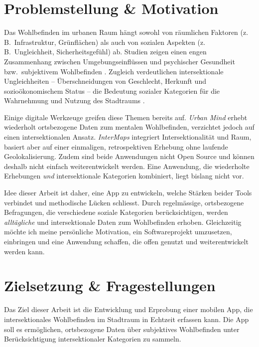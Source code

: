 \documentclass{template}
\begin{document}
\maketitle




\section{Problemstellung \& Motivation}
Das Wohlbefinden im urbanen Raum hängt sowohl von räumlichen Faktoren (z.\,B.\ Infrastruktur, Grünflächen) als auch von sozialen Aspekten (z.\,B.\ Ungleichheit, Sicherheitsgefühl) ab. Studien zeigen einen engen Zusammenhang zwischen Umgebungseinflüssen und psychischer Gesundheit bzw.\ subjektivem Wohlbefinden \parencite{kan_impacts_2022, hammoud_smartphone-based_2024, bergou_mental_2022}. Zugleich verdeutlichen intersektionale Ungleichheiten – Überschneidungen von Geschlecht, Herkunft und sozioökonomischem Status – die Bedeutung sozialer Kategorien für die Wahrnehmung und Nutzung des Stadtraums \parencite{webster_centering_2021, rodo-de-zarate_developing_2014, beebeejaun_race_2022}.

Einige digitale Werkzeuge greifen diese Themen bereits auf. \emph{Urban Mind} \parencite{bakolis_urban_2018} erhebt wiederholt ortsbezogene Daten zum mentalen Wohlbefinden, verzichtet jedoch auf einen intersektionalen Ansatz. \emph{InterMaps} \parencite{rodo-de-zarate_developing_2014} integriert Intersektionalität und Raum, basiert aber auf einer einmaligen, retrospektiven Erhebung ohne laufende Geolokalisierung. Zudem sind beide Anwendungen nicht Open Source und können deshalb nicht einfach weiterentwickelt werden. Eine Anwendung, die wiederholte Erhebungen \emph{und} intersektionale Kategorien kombiniert, liegt bislang nicht vor.

Idee dieser Arbeit ist daher, eine App zu entwickeln, welche Stärken beider Tools verbindet und methodische Lücken schliesst. Durch regelmässige, ortsbezogene Befragungen, die verschiedene soziale Kategorien berücksichtigen, werden \emph{alltägliche} und intersektionale Daten zum Wohlbefinden erhoben. Gleichzeitig möchte ich meine persönliche Motivation, ein Softwareprojekt umzusetzen, einbringen und eine Anwendung schaffen, die offen genutzt und weiterentwickelt werden kann.



\section{Zielsetzung \& Fragestellungen}
Das Ziel dieser Arbeit ist die Entwicklung und Erprobung einer mobilen App, die intersektionales Wohlbefinden im Stadtraum in Echtzeit erfassen kann. Die App soll es ermöglichen, ortsbezogene Daten über subjektives Wohlbefinden unter Berücksichtigung intersektionaler Kategorien zu sammeln.
\end{document}
